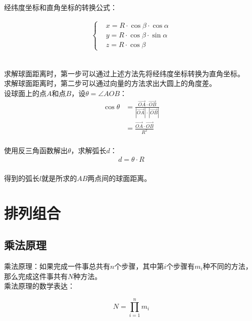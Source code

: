 \documentclass[UTF8]{ctexart}
\begin{document}
    经纬度坐标和直角坐标的转换公式：\vspace{5pt}
    \begin{large}
        \begin{align*}
            \begin{cases}
                &x=R\cdot\cos{\beta}\cdot\cos{\alpha}\\[2mm]
                &y=R\cdot\cos{\beta}\cdot\sin{\alpha}\\[2mm]
                &z=R\cdot\cos{\beta}
            \end{cases}
        \end{align*}
    \end{large}\\
    求解球面距离时，第一步可以通过上述方法先将经纬度坐标转换为直角坐标。\\[3mm]
    求解球面距离时，第二步可以通过向量的方法求出大圆上的角度差。\\[5mm]
    设球面上的点$A$和点$B$，设$\theta=\angle AOB$：\vspace{3pt}
    \begin{align}
        \cos{\theta}
        &=\frac{\overrightarrow{OA}\cdot\overrightarrow{OB}}{|\overrightarrow{OA}|\cdot|\overrightarrow{OB}|}\\[4mm]
        &=\frac{\overrightarrow{OA}\cdot\overrightarrow{OB}}{R^2}
    \end{align}\\
    使用反三角函数解出$\theta$，求解弧长$d$：
    \begin{align}
        d=\theta\cdot R
    \end{align}\\
    得到的弧长$l$就是所求的$AB$两点间的球面距离。

\newpage

\section{排列组合}

\subsection{乘法原理}
    乘法原理：如果完成一件事总共有$n$个步骤，其中第$i$个步骤有$m_i$种不同的方法，\\
    那么完成这件事共有$N$种方法。\\[3mm]
    乘法原理的数学表达：
    \begin{large}
        \begin{equation*}
            N=\prod_{i=1}^{n}m_i
        \end{equation*}
    \end{large}
\end{document}
